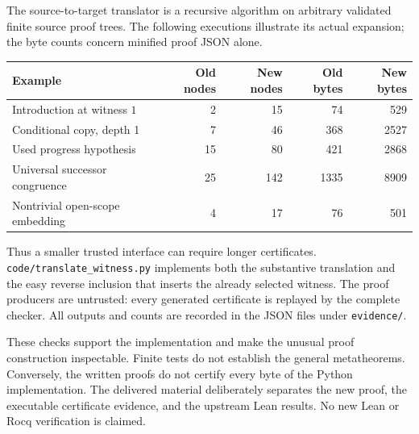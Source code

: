 \documentclass[11pt,letterpaper]{article}
\theoremstyle{definition}\newtheorem{definition}[theorem]{Definition}
\theoremstyle{remark}\newtheorem{remark}[theorem]{Remark}
\newcommand{\file}[1]{{\small\nolinkurl{#1}}}
\begin{document}
The source-to-target translator is a recursive algorithm on arbitrary
validated finite source proof trees. The following executions illustrate
its actual expansion; the byte counts concern minified proof JSON alone.
\begin{center}\small
\begin{tabularx}{\linewidth}{@{}Xrrrr@{}}
\toprule
Example & Old nodes & New nodes & Old bytes & New bytes\\
\midrule
Introduction at witness $1$ & 2 & 15 & 74 & 529\\
Conditional copy, depth 1 & 7 & 46 & 368 & 2527\\
Used progress hypothesis & 15 & 80 & 421 & 2868\\
Universal successor congruence & 25 & 142 & 1335 & 8909\\
Nontrivial open-scope embedding & 4 & 17 & 76 & 501\\
\bottomrule
\end{tabularx}
\end{center}
Thus a smaller trusted interface can require longer certificates.
\file{code/translate_witness.py} implements both the substantive
translation and the easy reverse inclusion that inserts the already
selected witness. The proof producers are untrusted: every generated
certificate is replayed by the complete checker. All outputs and counts
are recorded in the JSON files under \file{evidence/}.

These checks support the implementation and make the unusual proof
construction inspectable. Finite tests do not establish the general
metatheorems. Conversely, the written proofs do not certify every byte
of the Python implementation. The delivered material deliberately
separates the new proof, the executable certificate evidence, and the
upstream Lean results. No new Lean or Rocq verification is claimed.
\end{document}
